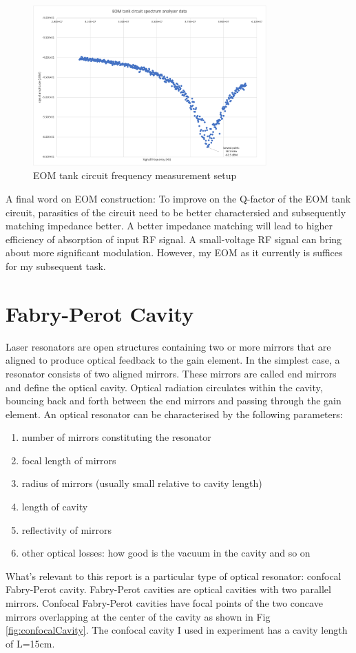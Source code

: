 \documentclass[12pt]{report}
\begin{document}
\begin{figure}[H]
    \centering
    \includegraphics[width=0.8\textwidth]{EOMfrequencyMeasurement.png}
    \caption{EOM tank circuit frequency measurement setup}
    \label{fig:EOMfrequencyMeasurement}
\end{figure}

A final word on EOM construction: To improve on the Q-factor of the EOM tank circuit, parasitics of the circuit need to be better charactersied and subsequently matching impedance better. A better impedance matching will lead to higher efficiency of absorption of input RF signal. A small-voltage RF signal can bring about more significant modulation. However, my EOM as it currently is suffices for my subsequent task. 

\section{Fabry-Perot Cavity}
Laser resonators are open structures containing two or more mirrors that are aligned to produce optical feedback to the gain element. In the simplest case, a resonator consists of two aligned mirrors. These mirrors are called end mirrors and define the optical cavity. Optical radiation circulates within the cavity, bouncing back and forth between the end mirrors and passing through the gain element. An optical resonator can be characterised by the following parameters: 
\begin{enumerate}
    \item number of mirrors constituting the resonator
    \item focal length of mirrors
    \item radius of mirrors (usually small relative to cavity length)
    \item length of cavity
    \item reflectivity of mirrors
    \item other optical losses: how good is the vacuum in the cavity and so on
\end{enumerate}
What's relevant to this report is a particular type of optical resonator: confocal Fabry-Perot cavity. Fabry-Perot cavities are optical cavities with two parallel mirrors. Confocal Fabry-Perot cavities have focal points of the two concave mirrors overlapping at the center of the cavity as shown in Fig \ref{fig:confocalCavity}. The confocal cavity I used in experiment has a cavity length of L=15cm. 
\end{document}
